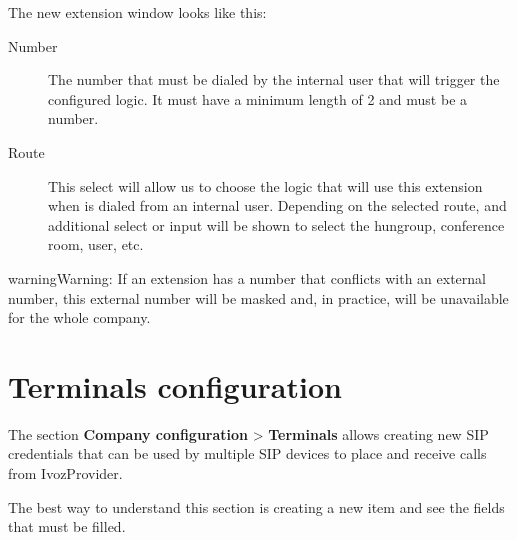 \documentclass[letterpaper,10pt,english]{sphinxmanual}
\begin{document}
The new extension window looks like this:

\noindent{}
\begin{description}
\item[{Number}] \leavevmode{}\label{pbx_features/extensions:term-number}
The number that must be dialed by the internal user that will trigger
the configured logic. It must have a minimum length of 2 and must be
a number.

\item[{Route}] \leavevmode{}\label{pbx_features/extensions:term-route}
This select will allow us to choose the logic that will use this
extension when is dialed from an internal user. Depending on the selected
route, and additional select or input will be shown to select the
hungroup, conference room, user, etc.

\end{description}

\begin{notice}{warning}{Warning:}
If an extension has a number that conflicts with an external
number, this external number will be masked and, in practice, will be
unavailable for the whole company.
\end{notice}


\section{Terminals configuration}
\label{pbx_features/terminals:terminals}\label{pbx_features/terminals::doc}\label{pbx_features/terminals:terminals-configuration}
The section \textbf{Company configuration} \textgreater{} \textbf{Terminals} allows creating new
SIP credentials that can be used by multiple SIP devices to place and receive
calls from IvozProvider.

The best way to understand this section is creating a new item and see the
fields that must be filled.
\end{document}
